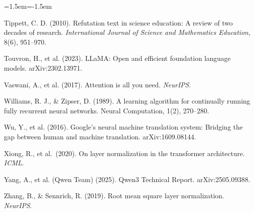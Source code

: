 \begin{list}{}{\leftmargin=1.5em\itemindent=-1.5em\itemsep=2pt\small}
\item Tippett, C. D. (2010). Refutation text in science education: A review of two decades of research. \emph{International Journal of Science and Mathematics Education}, 8(6), 951--970.
\item Touvron, H., et al. (2023). LLaMA: Open and efficient foundation language models. arXiv:2302.13971.
\item Vaswani, A., et al. (2017). Attention is all you need. \emph{NeurIPS}.
\item Williams, R. J., \& Zipser, D. (1989). A learning algorithm for continually running fully recurrent neural networks. Neural Computation, 1(2), 270--280.
\item Wu, Y., et al. (2016). Google's neural machine translation system: Bridging the gap between human and machine translation. arXiv:1609.08144.
\item Xiong, R., et al.\ (2020). On layer normalization in the transformer architecture. \emph{ICML}.
\item Yang, A., et al. (Qwen Team) (2025). Qwen3 Technical Report. arXiv:2505.09388.
\item Zhang, B., \& Sennrich, R. (2019). Root mean square layer normalization. \emph{NeurIPS}.
\end{list}
